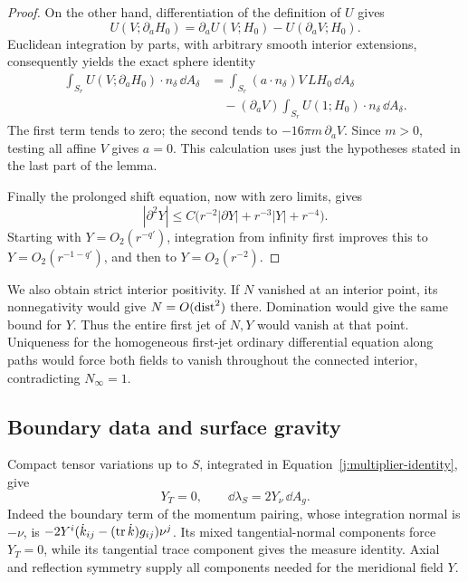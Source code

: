 \begin{proof}
On the other hand, differentiation of the definition of \(U\) gives
\[
 U(V;\partial_aH_0)=\partial_aU(V;H_0)-U(\partial_aV;H_0).
\]
Euclidean integration by parts, with arbitrary smooth interior
extensions, consequently yields the exact sphere identity
\begin{equation}
\label{j:boost-flux}
 \begin{split}
 \int_{S_r}U(V;\partial_aH_0)\cdot n_\delta\,\dd A_\delta
 &=\int_{S_r}(a\cdot n_\delta)V\,LH_0\,\dd A_\delta\\
 &\quad-(\partial_aV)
         \int_{S_r}U(1;H_0)\cdot n_\delta\,\dd A_\delta.
 \end{split}
\end{equation}
The first term tends to zero; the second tends to
\(-16\pi m\,\partial_aV\). Since \(m>0\), testing all affine \(V\)
gives \(a=0\). This calculation uses just the hypotheses stated in the
last part of the lemma.

Finally the prolonged shift equation, now with zero limits, gives
\[
 |\partial^2Y|
 \leq C\bigl(r^{-2}|\partial Y|+r^{-3}|Y|+r^{-4}\bigr).
\]
Starting with \(Y=O_2(r^{-q'})\), integration from infinity first
improves this to \(Y=O_2(r^{-1-q'})\), and then to
\(Y=O_2(r^{-2})\).
\end{proof}

We also obtain strict interior positivity. If \(N\) vanished at an interior
point, its nonnegativity would give \(N=O(\operatorname{dist}^2)\) there. Domination
would give the same bound for \(Y\). Thus the entire first jet of \(N,Y\)
would vanish at that point. Uniqueness for the homogeneous first-jet
ordinary differential equation along paths would force both fields to
vanish throughout the connected interior, contradicting \(N_\infty=1\).

\subsection{Boundary data and surface gravity}

Compact tensor variations up to \(S\), integrated in
Equation~\eqref{j:multiplier-identity}, give
\begin{equation}
\label{j:boundary-measure}
 Y_T=0,\qquad \dd\lambda_S=2Y_\nu\,\dd A_g.
\end{equation}
Indeed the boundary term of the momentum pairing, whose integration
normal is \(-\nu\), is
\(-2Y^i(\dot k_{ij}-(\operatorname{tr}\dot k)g_{ij})\nu^j\).
Its mixed tangential-normal components force \(Y_T=0\), while its
tangential trace component gives the measure identity. Axial and
reflection symmetry supply all components needed for the meridional
field \(Y\).

